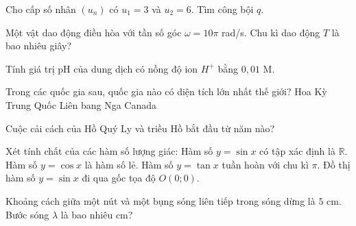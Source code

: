 \begin{ex}
    Cho cấp số nhân $(u_n)$ có $u_1 = 3$ và $u_2 = 6$. Tìm công bội $q$.
\end{ex}

\begin{ex}
    Một vật dao động điều hòa với tần số góc $\omega = 10\pi$ rad/s. Chu kì dao động $T$ là bao nhiêu giây?
\end{ex}

\begin{ex}
    Tính giá trị pH của dung dịch có nồng độ ion $H^+$ bằng $0,01$ M.
\end{ex}

\begin{ex}
    Trong các quốc gia sau, quốc gia nào có diện tích lớn nhất thế giới?
    \choice
    {Hoa Kỳ}
    {Trung Quốc}
    {\True Liên bang Nga}
    {Canada}
\end{ex}

\begin{ex}
    Cuộc cải cách của Hồ Quý Ly và triều Hồ bắt đầu từ năm nào?
\end{ex}

\begin{ex}
    Xét tính chất của các hàm số lượng giác:
    \choiceTF
    {\True Hàm số $y = \sin x$ có tập xác định là $\mathbb{R}$.}
    {Hàm số $y = \cos x$ là hàm số lẻ.}
    {\True Hàm số $y = \tan x$ tuần hoàn với chu kì $\pi$.}
    {\True Đồ thị hàm số $y = \sin x$ đi qua gốc tọa độ $O(0;0)$.}
\end{ex}

\begin{ex}
    Khoảng cách giữa một nút và một bụng sóng liên tiếp trong sóng dừng là $5$ cm. Bước sóng $\lambda$ là bao nhiêu cm?
\end{ex}

